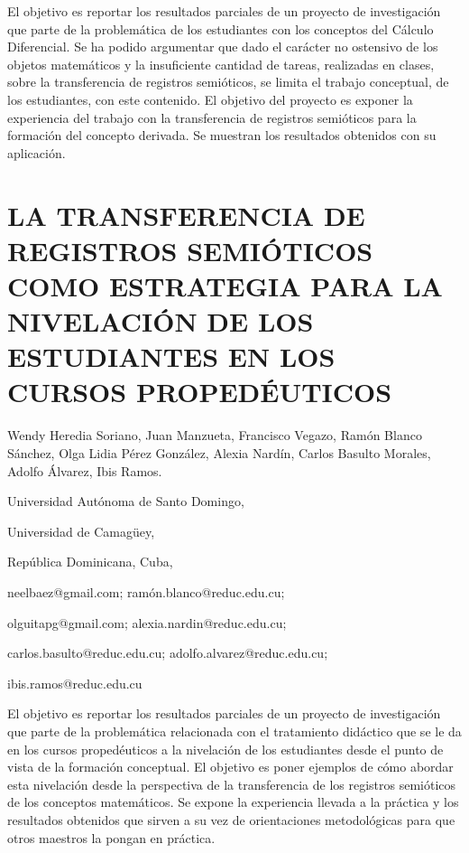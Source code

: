 El objetivo es reportar los resultados parciales de un proyecto de
investigación que parte de la problemática de los estudiantes con
los conceptos del Cálculo Diferencial. Se ha podido argumentar que
dado el carácter no ostensivo de los objetos matemáticos y la insuficiente
cantidad de tareas, realizadas en clases, sobre la transferencia de
registros semióticos, se limita el trabajo conceptual, de los estudiantes,
con este contenido. El objetivo del proyecto es exponer la experiencia
del trabajo con la transferencia de registros semióticos para la formación
del concepto derivada. Se muestran los resultados obtenidos con su
aplicación.


\section{LA TRANSFERENCIA DE REGISTROS SEMIÓTICOS COMO ESTRATEGIA PARA LA
NIVELACIÓN DE LOS ESTUDIANTES EN LOS CURSOS PROPEDÉUTICOS}

\begin{datos}

Wendy Heredia Soriano, Juan Manzueta, Francisco Vegazo, Ramón Blanco
Sánchez, Olga Lidia Pérez González, Alexia Nardín, Carlos Basulto
Morales, Adolfo Álvarez, Ibis Ramos.

Universidad Autónoma de Santo Domingo,

Universidad de Camagüey,

República Dominicana, Cuba,

neelbaez@gmail.com; ramón.blanco@reduc.edu.cu;

olguitapg@gmail.com; alexia.nardin@reduc.edu.cu;

carlos.basulto@reduc.edu.cu; adolfo.alvarez@reduc.edu.cu; 

ibis.ramos@reduc.edu.cu

\end{datos}

El objetivo es reportar los resultados parciales de un proyecto de
investigación que parte de la problemática relacionada con el tratamiento
didáctico que se le da en los cursos propedéuticos a la nivelación
de los estudiantes desde el punto de vista de la formación conceptual.
El objetivo es poner ejemplos de cómo abordar esta nivelación desde
la perspectiva de la transferencia de los registros semióticos de
los conceptos matemáticos. Se expone la experiencia llevada a la práctica
y los resultados obtenidos que sirven a su vez de orientaciones metodológicas
para que otros maestros la pongan en práctica.


